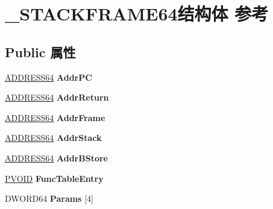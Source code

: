 \hypertarget{struct___s_t_a_c_k_f_r_a_m_e64}{}\section{\+\_\+\+S\+T\+A\+C\+K\+F\+R\+A\+M\+E64结构体 参考}
\label{struct___s_t_a_c_k_f_r_a_m_e64}
\subsection*{Public 属性}
\begin{DoxyCompactItemize}
\item 
\mbox{\label{struct___s_t_a_c_k_f_r_a_m_e64_ad55f4c8be4f578b745bd8ab6609a610c}} 
\hyperlink{struct__tag_a_d_d_r_e_s_s64}{A\+D\+D\+R\+E\+S\+S64} {\bfseries Addr\+PC}
\item 
\mbox{\label{struct___s_t_a_c_k_f_r_a_m_e64_afce77741d13c8a081c47860193ab5001}} 
\hyperlink{struct__tag_a_d_d_r_e_s_s64}{A\+D\+D\+R\+E\+S\+S64} {\bfseries Addr\+Return}
\item 
\mbox{\label{struct___s_t_a_c_k_f_r_a_m_e64_ad5062d07c7beeb5f8f5609fc11bff71c}} 
\hyperlink{struct__tag_a_d_d_r_e_s_s64}{A\+D\+D\+R\+E\+S\+S64} {\bfseries Addr\+Frame}
\item 
\mbox{\label{struct___s_t_a_c_k_f_r_a_m_e64_a27ebc5ecf3090e89ef6d75d1605d0b4b}} 
\hyperlink{struct__tag_a_d_d_r_e_s_s64}{A\+D\+D\+R\+E\+S\+S64} {\bfseries Addr\+Stack}
\item 
\mbox{\label{struct___s_t_a_c_k_f_r_a_m_e64_a235723e5cf1631df8e6e3f80e1ccf390}} 
\hyperlink{struct__tag_a_d_d_r_e_s_s64}{A\+D\+D\+R\+E\+S\+S64} {\bfseries Addr\+B\+Store}
\item 
\mbox{\label{struct___s_t_a_c_k_f_r_a_m_e64_a0bd9706bd877389816bd186995dd9ced}} 
\hyperlink{interfacevoid}{P\+V\+O\+ID} {\bfseries Func\+Table\+Entry}
\item 
\mbox{\label{struct___s_t_a_c_k_f_r_a_m_e64_ae371e0a6c6831b9eba33ac8816670d91}} 
D\+W\+O\+R\+D64 {\bfseries Params} \mbox{[}4\mbox{]}

\end{DoxyCompactItemize}
